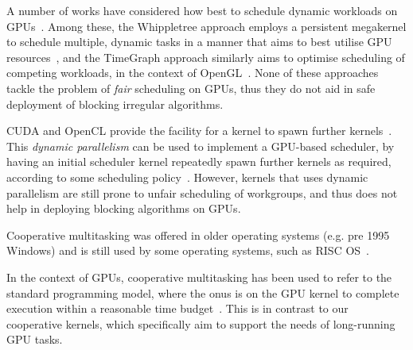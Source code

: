 \documentclass[parskip=half,sigconf,review, anonymous=true, acmcopyrightmode=none]{acmart}
\begin{document}


%
A number of works have considered how best to schedule dynamic
workloads on
GPUs~\cite{DBLP:journals/tog/SteinbergerKKHKS12,DBLP:conf/ics/WuCLSV15,DBLP:conf/usenix/KatoLRI11,DBLP:journals/tog/SteinbergerKBKDS14,DBLP:journals/rts/ElliottA12,DBLP:conf/sosp/RossbachCSRW11}.
Among these, the Whippletree approach employs a persistent megakernel
to schedule multiple, dynamic tasks in a manner that aims to best
utilise GPU resources~\cite{DBLP:journals/tog/SteinbergerKBKDS14}, and
the TimeGraph approach similarly aims to optimise scheduling of
competing workloads, in the context of
OpenGL~\cite{DBLP:conf/usenix/KatoLRI11}.  None of these approaches
tackle the problem of \emph{fair} scheduling on GPUs, thus they do not
aid in safe deployment of blocking irregular algorithms.

CUDA and OpenCL provide the facility for a kernel to spawn further
kernels~\cite{cuda-75}.  This \emph{dynamic parallelism}
can be used to implement a GPU-based scheduler, by having an initial
scheduler kernel repeatedly spawn further kernels as required,
according to some scheduling
policy~\cite{DBLP:conf/ppopp/Muyan-OzcelikO16}.  However, kernels that
uses dynamic parallelism are still prone to unfair scheduling of
workgroups, and thus does not help in deploying blocking algorithms on
GPUs.

%
Cooperative multitasking was offered in older operating systems
(e.g. pre 1995 Windows) and is still used by some operating systems,
such as RISC OS~\cite{risc-os-multitasking}.


In the context of GPUs, cooperative multitasking has been used to
refer to the standard programming model, where the onus is on the GPU kernel
to complete execution within a reasonable time budget~\cite{adriaens2012case,CPE:CPE1722}.
%
This is in contrast to our cooperative kernels, which specifically aim to support the needs of long-running GPU tasks.

\end{document}
